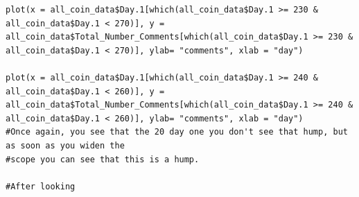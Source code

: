 \documentclass[12pt]{article}
\begin{document}
{\begin{verbatim}
plot(x = all_coin_data$Day.1[which(all_coin_data$Day.1 >= 230 & all_coin_data$Day.1 < 270)], y = all_coin_data$Total_Number_Comments[which(all_coin_data$Day.1 >= 230 & all_coin_data$Day.1 < 270)], ylab= "comments", xlab = "day")

plot(x = all_coin_data$Day.1[which(all_coin_data$Day.1 >= 240 & all_coin_data$Day.1 < 260)], y = all_coin_data$Total_Number_Comments[which(all_coin_data$Day.1 >= 240 & all_coin_data$Day.1 < 260)], ylab= "comments", xlab = "day")
#Once again, you see that the 20 day one you don't see that hump, but as soon as you widen the
#scope you can see that this is a hump.

#After looking
\end{verbatim} }
\end{document}

